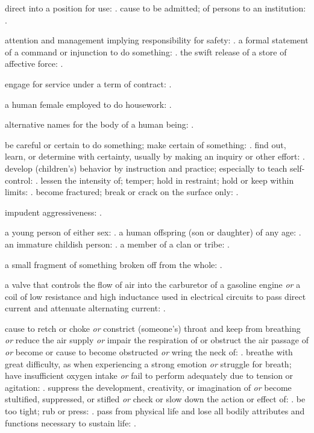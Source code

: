   direct into a position for use: . cause to be admitted; of persons to an institution: .

  attention and management implying responsibility for safety: . a formal statement of a command or injunction to do something: . the swift release of a store of affective force: .

  engage for service under a term of contract: .

  a human female employed to do housework: .

  alternative names for the body of a human being: .

  be careful or certain to do something; make certain of something: . find out, learn, or determine with certainty, usually by making an inquiry or other effort: . develop (children's) behavior by instruction and practice; especially to teach self-control: . lessen the intensity of; temper; hold in restraint; hold or keep within limits: . become fractured; break or crack on the surface only: .

  impudent aggressiveness: .

  a young person of either sex: . a human offspring (son or daughter) of any age: . an immature childish person: . a member of a clan or tribe: .

  a small fragment of something broken off from the whole: .

  a valve that controls the flow of air into the carburetor of a gasoline engine \textit{or} a coil of low resistance and high inductance used in electrical circuits to pass direct current and attenuate alternating current: .

  cause to retch or choke \textit{or} constrict (someone's) throat and keep from breathing \textit{or} reduce the air supply \textit{or} impair the respiration of or obstruct the air passage of \textit{or} become or cause to become obstructed \textit{or} wring the neck of: . breathe with great difficulty, as when experiencing a strong emotion \textit{or} struggle for breath; have insufficient oxygen intake \textit{or} fail to perform adequately due to tension or agitation: . suppress the development, creativity, or imagination of \textit{or} become stultified, suppressed, or stifled \textit{or} check or slow down the action or effect of: . be too tight; rub or press: . pass from physical life and lose all bodily attributes and functions necessary to sustain life: .


